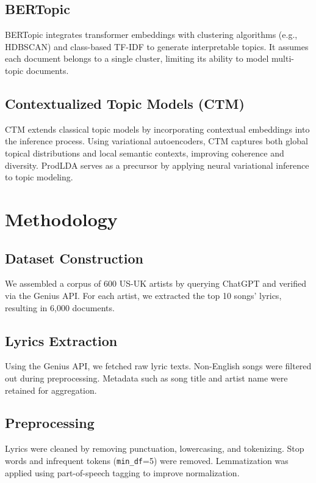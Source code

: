 \documentclass[12pt]{article}
\begin{document}
\subsection{BERTopic}
BERTopic \cite{grootendorst2022bertopic} integrates transformer embeddings with
clustering algorithms (e.g., HDBSCAN) and class-based TF-IDF to generate
interpretable topics. It assumes each document belongs to a single cluster,
limiting its ability to model multi-topic documents.

\subsection{Contextualized Topic Models (CTM)}
CTM \cite{charnois2021contextualized} extends classical topic models by
incorporating contextual embeddings into the inference process. Using
variational autoencoders, CTM captures both global topical distributions and
local semantic contexts, improving coherence and diversity. ProdLDA
\cite{srivastava2017autoencoding} serves as a precursor by applying neural
variational inference to topic modeling.

\section{Methodology}
\subsection{Dataset Construction}
We assembled a corpus of 600 US-UK artists by querying ChatGPT and verified via
the Genius API. For each artist, we extracted the top 10 songs' lyrics,
resulting in 6,000 documents.

\subsection{Lyrics Extraction}
Using the Genius API, we fetched raw lyric texts. Non-English songs were
filtered out during preprocessing. Metadata such as song title and artist name
were retained for aggregation.

\subsection{Preprocessing}
Lyrics were cleaned by removing punctuation, lowercasing, and tokenizing. Stop
words and infrequent tokens (\texttt{min\_df}=5) were removed. Lemmatization
was applied using part-of-speech tagging to improve normalization.
\end{document}
